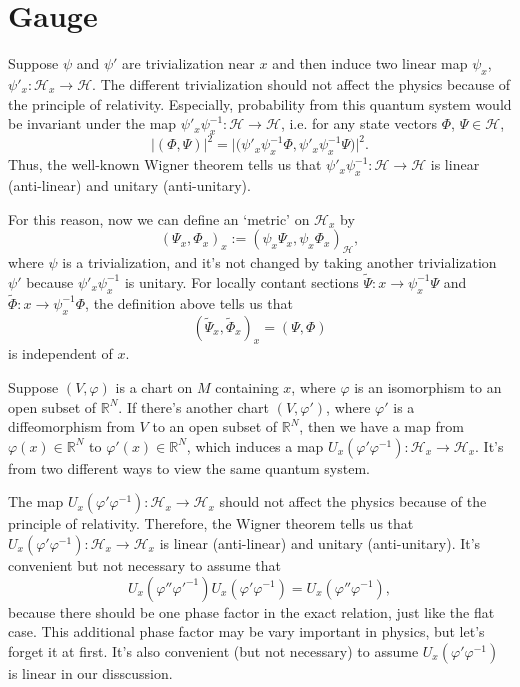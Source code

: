 \documentclass[12pt]{article}
\theoremstyle{definition}
\theoremstyle{plain}
\begin{document}
\section{Gauge}

Suppose $\psi$ and $\psi'$ are trivialization near $x$ and then induce two linear map $\psi_x$, $\psi'_x:\mathcal H_x\to \mathcal H$. The different trivialization should not affect the physics because of the principle of relativity. Especially, probability from this quantum system would be invariant under the map $\psi'_x\psi^{-1}_x:\mathcal H\to \mathcal H$, i.e. for any state vectors $\Phi$, $\Psi\in \mathcal H$,
\[
	|(\Phi,\Psi)|^2=\bigl|\bigl(\psi'_x\psi^{-1}_x\Phi,\psi'_x\psi^{-1}_x\Psi\bigr)\bigr|^2.
\]
Thus, the well-known Wigner theorem tells us that $\psi'_x\psi^{-1}_x:\mathcal H\to \mathcal H$ is linear (anti-linear) and unitary (anti-unitary). 

For this reason, now we can define an `metric' on $\mathcal H_x$ by
\[
	(\Psi_x,\Phi_x)_x:=\left(\psi_x\Psi_x,\psi_x\Phi_x\right)_{\mathcal H},
\]
where $\psi$ is a trivialization, and it's not changed by taking another trivialization $\psi'$ because $\psi'_x\psi^{-1}_x$ is unitary. For locally contant sections $\widetilde \Psi:x\to \psi_x^{-1}\Psi$ and $\widetilde \Phi:x\to \psi_x^{-1}\Phi$, the definition above tells us that
\[
	(\widetilde \Psi_x,\widetilde \Phi_x)_x=(\Psi,\Phi)
\]
is independent of $x$.

Suppose $(V,\varphi)$ is a chart on $M$ containing $x$, where $\varphi$ is an isomorphism to an open subset of $\mathbb R^{N}$. If there's another chart $(V,\varphi')$, where $\varphi'$ is a diffeomorphism from $V$ to an open subset of $\mathbb R^{N}$, then we have a map from $\varphi(x)\in \mathbb R^N$ to $\varphi'(x)\in \mathbb R^N$, which induces a map $U_x(\varphi'\varphi^{-1}):\mathcal H_x\to \mathcal H_x$. It's from two different ways to view the same quantum system.

The map $U_x(\varphi'\varphi^{-1}):\mathcal H_x\to \mathcal H_x$ should not affect the physics because of the principle of relativity. Therefore, the Wigner theorem tells us that $U_x(\varphi'\varphi^{-1}):\mathcal H_x\to \mathcal H_x$ is linear (anti-linear) and unitary (anti-unitary). It's convenient but not necessary to assume that 
\[
	U_x(\varphi''\varphi'^{-1})U_x(\varphi'\varphi^{-1})=U_x(\varphi''\varphi^{-1}),
\] 
because there should be one phase factor in the exact relation, just like the flat case. This additional phase factor may be vary important in physics, but let's forget it at first. It's also convenient (but not necessary) to assume $U_x(\varphi'\varphi^{-1})$ is linear in our disscussion.
\end{document}
